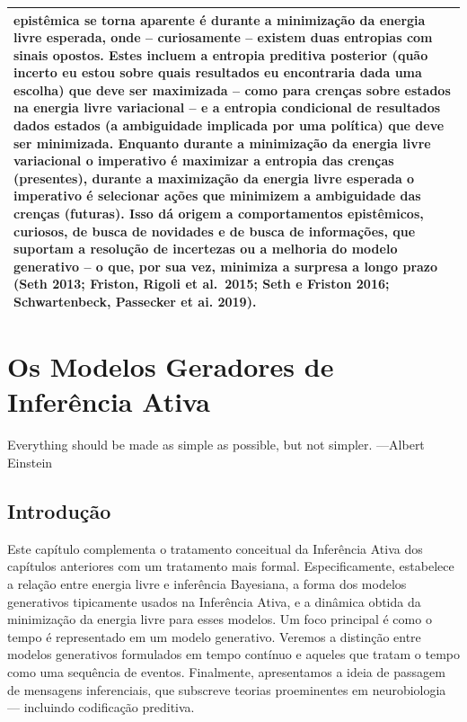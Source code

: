 \documentclass[
  12pt,
]{book}
\begin{document}
\begin{longtable}[]{@{}
  >{\raggedright\arraybackslash}p{}@{}}
epistêmica se torna aparente é durante a minimização da energia livre esperada, onde -- curiosamente -- existem duas entropias com sinais opostos. Estes incluem a entropia preditiva posterior (quão incerto eu estou sobre quais resultados eu encontraria dada uma escolha) que deve ser maximizada -- como para crenças sobre estados na energia livre variacional -- e a entropia condicional de resultados dados estados (a ambiguidade implicada por uma política) que deve ser minimizada. Enquanto durante a minimização da energia livre variacional o imperativo é maximizar a entropia das crenças (presentes), durante a maximização da energia livre esperada o imperativo é selecionar ações que minimizem a ambiguidade das crenças (futuras). Isso dá origem a comportamentos epistêmicos, curiosos, de busca de novidades e de busca de informações, que suportam a resolução de incertezas ou a melhoria do modelo generativo -- o que, por sua vez, minimiza a surpresa a longo prazo (Seth 2013; Friston, Rigoli et al.~2015; Seth e Friston 2016; Schwartenbeck, Passecker et ai. 2019). \\
\bottomrule
\end{longtable}

\hypertarget{os-modelos-geradores-de-inferuxeancia-ativa}{%
\chapter{Os Modelos Geradores de Inferência Ativa}\label{os-modelos-geradores-de-inferuxeancia-ativa}}

Every­thing should be made as ­simple as pos­si­ble, but not simpler.
---­Albert Einstein

\hypertarget{introduuxe7uxe3o-3}{%
\section{Introdução}\label{introduuxe7uxe3o-3}}

Este capítulo complementa o tratamento conceitual da Inferência Ativa
dos capítulos anteriores com um tratamento mais formal. Especificamente,
estabelece a relação entre energia livre e inferência Bayesiana, a forma
dos modelos generativos tipicamente usados na Inferência Ativa, e a
dinâmica obtida da minimização da energia livre para esses modelos. Um
foco principal é como o tempo é representado em um modelo generativo.
Veremos a distinção entre modelos generativos formulados em tempo
contínuo e aqueles que tratam o tempo como uma sequência de eventos.
Finalmente, apresentamos a ideia de passagem de mensagens inferenciais,
que subscreve teorias proeminentes em neurobiologia --- incluindo
codificação preditiva.
\end{document}
